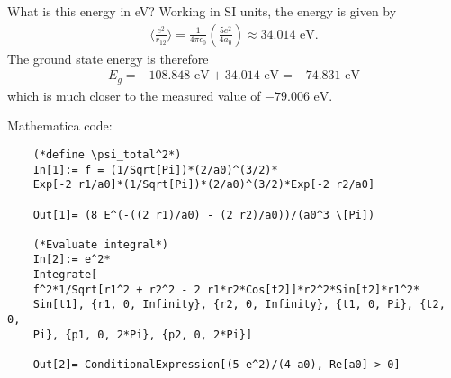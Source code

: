 \documentclass{article}
\theoremstyle{definition}
\newcommand{\f}[2]{\frac{#1}{#2}}
\newcommand{\lp}{\left(}
\newcommand{\rp}{\right)}
\begin{document}
\begin{enumerate}[label=(\alph*)]
	What is this energy in eV? Working in SI units, the energy is given by 
	\begin{align*}
	\bigg\langle \f{e^2}{r_{12}}\bigg\rangle = \f{1}{4\pi \epsilon_0} \lp \f{5e^2}{4a_0} \rp \approx 34.014 \text{ eV}. 
	\end{align*}
	The ground state energy is therefore 
	\begin{align*}
	E_g = -108.848 \text{ eV} + 34.014 \text{ eV} = \boxed{-74.831 \text{ eV}}
	\end{align*}
	which is much closer to the measured value of $-79.006 \text{ eV}$.
	
	
	
	
	
	
	
	
	
	Mathematica code:
	\begin{lstlisting}
	(*define \psi_total^2*)
	In[1]:= f = (1/Sqrt[Pi])*(2/a0)^(3/2)*
	Exp[-2 r1/a0]*(1/Sqrt[Pi])*(2/a0)^(3/2)*Exp[-2 r2/a0]
	
	Out[1]= (8 E^(-((2 r1)/a0) - (2 r2)/a0))/(a0^3 \[Pi])
	
	(*Evaluate integral*)
	In[2]:= e^2*
	Integrate[
	f^2*1/Sqrt[r1^2 + r2^2 - 2 r1*r2*Cos[t2]]*r2^2*Sin[t2]*r1^2*
	Sin[t1], {r1, 0, Infinity}, {r2, 0, Infinity}, {t1, 0, Pi}, {t2, 0,
	Pi}, {p1, 0, 2*Pi}, {p2, 0, 2*Pi}]
	
	Out[2]= ConditionalExpression[(5 e^2)/(4 a0), Re[a0] > 0]
	\end{lstlisting}
	
	
	
	
	

\end{enumerate}
\end{document}
